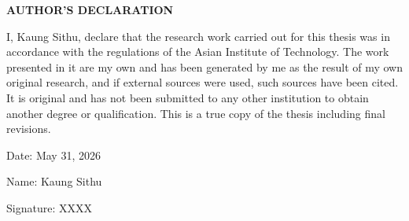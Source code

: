 {}
\begin{center}
    \large{\bf AUTHOR'S DECLARATION}
\end{center}

I, Kaung Sithu, declare that the research work carried out for this thesis was in accordance with the regulations of the Asian Institute of Technology. The work presented in it are my own and has been generated by me as the result of my own original research, and if external sources were used, such sources have been cited. It is original and has not been submitted to any other institution to obtain another degree or qualification. This is a true copy of the thesis including final revisions.

Date: May 31, 2026

Name: Kaung Sithu


Signature: XXXX

